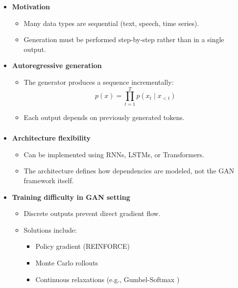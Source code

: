 \documentclass[xcolor=table]{beamer}
\begin{document}
	\begin{subsectionframe}
		\begin{itemize}
			
			\item \textbf{Motivation}
			\begin{itemize}
				\item Many data types are sequential (text, speech, time series).
				\item Generation must be performed step-by-step rather than in a single output.
			\end{itemize}
			
			\item \textbf{Autoregressive generation}
			\begin{itemize}
				\item The generator produces a sequence incrementally:
				\[
				p(x) = \prod_{t=1}^{T} p(x_t \mid x_{<t})
				\]
				\item Each output depends on previously generated tokens.
			\end{itemize}
			
		\end{itemize}
	\end{subsectionframe}
	
	\begin{frame}
		\frametitle{\insertshortsubtitle}
		\framesubtitle{\insertsection}
		
		\begin{itemize}
			
			\item \textbf{Architecture flexibility}
			\begin{itemize}
				\item Can be implemented using RNNs, LSTMs, or Transformers.
				\item The architecture defines how dependencies are modeled, not the GAN framework itself.
			\end{itemize}
			
			\item \textbf{Training difficulty in GAN setting}
			\begin{itemize}
				\item Discrete outputs prevent direct gradient flow.
				\item Solutions include:
				\begin{itemize}
					\item Policy gradient (REINFORCE) \cite{williams1992simple}
					\item Monte Carlo rollouts \cite{yu2017seqgan}
					\item Continuous relaxations (e.g., Gumbel-Softmax \cite{jang2017categorical})
				\end{itemize}
			\end{itemize}
			
		\end{itemize}
		
	\end{frame}
	
\end{document}
